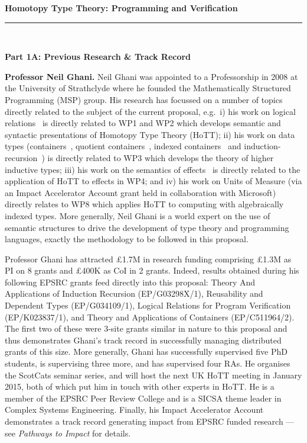 \documentclass[a4paper,11pt]{article}
\newcommand{\eg}{{e.g.}\ }
\begin{document}
\thispagestyle{plain}
\begin{center}
  {\Large {\bf Homotopy Type Theory: Programming and Verification}}\\[1ex] 
\vspace*{-0.1in}

  \rule{140mm}{.5mm}\\[2ex]
\end{center}

\noindent
{\bf \Large Part 1A: Previous Research \& Track Record}

\textbf{Professor Neil Ghani.} Neil Ghani was appointed to a
Professorship in 2008 at the University of Strathclyde where he
founded the Mathematically Structured Programming (MSP) group. His
research has focussed on a number of topics directly related to the
subject of the current proposal, \eg i) his work on logical
relations~\cite{neil2014relParamDep} is directly related to WP1 and
WP2 which develops semantic and syntactic presentations of Homotopy
Type Theory (HoTT); ii) his work on data types
(containers~\cite{alti:cont-tcs}, quotient
containers~\cite{alti:mpc04}, indexed
containers~\cite{altenkirchGhaniHancockMcBrideMorris:indexedContainers}
and
induction-recursion~\cite{ghani:fibredIR})
is directly related to WP3 which develops the theory of higher
inductive types; iii) his work on the semantics of
effects~\cite{atkeyGhaniJacobsJohann:effects} is directly related to
the application of HoTT to effects in WP4; and iv) his work on Units
of Measure (via an Impact Accelerator Account grant held in
collaboration with Microsoft) directly relates to WP8 which applies
HoTT to computing with algebraically indexed types. More generally, Neil
Ghani is a world expert on the use of semantic structures to drive the
development of type theory and programming languages, exactly the
methodology to be followed in this proposal.

Professor Ghani has attracted \pounds 1.7M in research funding
comprising \pounds 1.3M as PI on 8 grants and \pounds 400K as CoI in 2
grants.  Indeed, results obtained during his following EPSRC grants
feed directly into this proposal: Theory And Applications of Induction
Recursion (EP/G03298X/1), Reusability and Dependent Types
(EP/G034109/1), Logical Relations for Program Verification
(EP/K023837/1), and Theory and Applications of Containers
(EP/C511964/2). The first two of these were 3-site grants similar in
nature to this proposal and thus demonstrates Ghani's track record in
successfully managing distributed grants of this size. More generally,
Ghani has successfully supervised five PhD students, is supervising
three more, and has supervised four RAs. He organises the ScotCats
seminar series, and will host the next UK HoTT meeting in January
2015, both of which put him in touch with other experts in HoTT. He is
a member of the EPSRC Peer Review College and is a SICSA theme leader
in Complex Systems Engineering. Finally, his Impact Accelerator
Account demonstrates a track record generating impact from EPSRC
funded research --- see {\em Pathways to Impact} for details.
\end{document}
